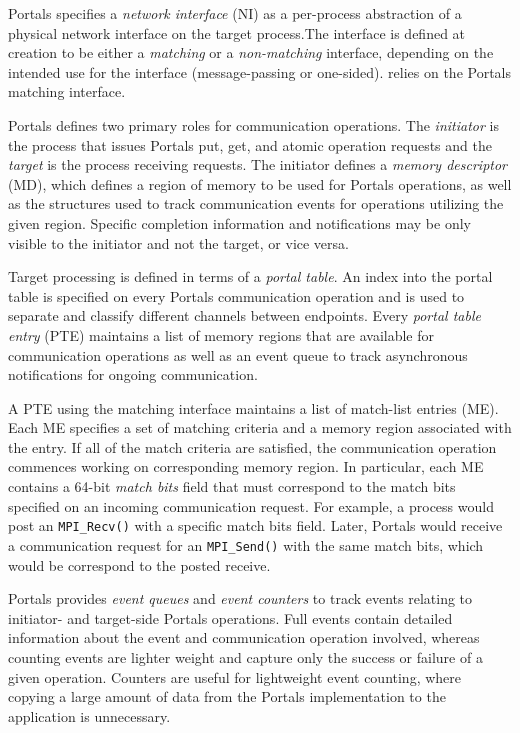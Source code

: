 Portals specifies a {\em network interface} (NI) as a per-process
abstraction of a physical network interface on the target process.The
interface is defined at creation to be either a {\em matching}
or a {\em non-matching} interface, depending on the intended use for
the interface (message-passing or one-sided). \pdht relies on the
Portals matching interface.

Portals defines two primary roles for communication operations. The
{\em initiator} is the process that issues Portals put, get, and atomic operation
requests and the {\em target} is the process receiving
requests. The initiator defines a {\em memory descriptor} (MD), which defines a
region of memory to be used for Portals operations, as well as the
structures used to track communication events for operations utilizing the
given region.  Specific completion information
and notifications may be only visible to the initiator and not the
target, or vice versa.

Target processing is defined in terms of a {\em portal table}. An index into the
portal table is specified on every Portals communication operation and
is used to separate and classify different channels between endpoints.
Every {\em portal table entry} (PTE) maintains a list of memory regions that
are available for communication operations as well as an event queue
to track asynchronous notifications for ongoing communication.

A PTE using the matching interface maintains a list of match-list
entries (ME). Each ME specifies a set of matching criteria and a
memory region associated with the entry. If all of the match criteria
are satisfied, the communication operation commences working on
corresponding memory region. In particular, each ME contains a 64-bit
{\em match bits} field that must correspond to the match bits
specified on an incoming communication request. For example, a process
would post an {\tt MPI\_Recv()} with a specific match bits
field. Later, Portals would receive a communication request for an
{\tt MPI\_Send()} with the same match bits, which would be correspond
to the posted receive.

Portals provides {\em event queues} and {\em event counters} to track events
relating to initiator- and target-side Portals operations.  Full events contain
detailed information about the event and communication operation involved,
whereas counting events are lighter weight and capture only the success or
failure of a given operation.
Counters are useful for lightweight event counting, where copying a
large amount of data from the Portals implementation to the
application is unnecessary.

